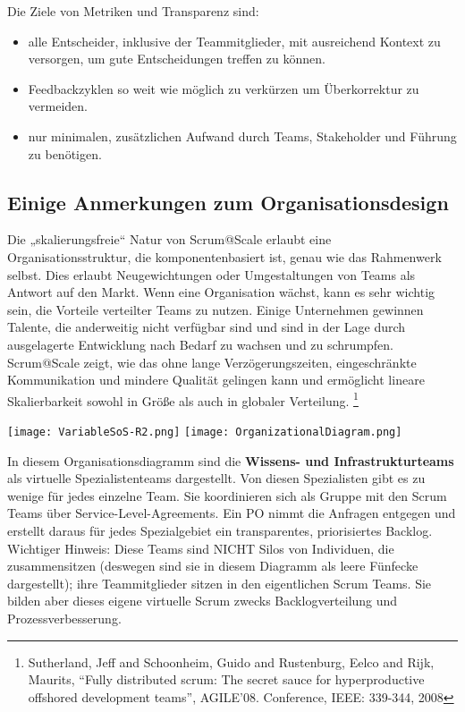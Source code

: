 \documentclass[12pt,a4paper,parskip=full]{scrartcl}
\begin{document}
Die Ziele von Metriken und Transparenz sind:
\begin{itemize}
\item alle Entscheider, inklusive der Teammitglieder, mit ausreichend Kontext zu
versorgen, um gute Entscheidungen treffen zu können.
\item Feedbackzyklen so weit wie möglich zu verkürzen um Überkorrektur zu vermeiden.
\item nur minimalen, zusätzlichen Aufwand durch Teams, Stakeholder und Führung zu
benötigen.
\end{itemize}

\subsection{Einige Anmerkungen zum Organisationsdesign}
Die „skalierungsfreie“ Natur von Scrum@Scale erlaubt eine Organisationsstruktur,
die komponentenbasiert ist, genau wie das Rahmenwerk selbst. Dies erlaubt
Neugewichtungen oder Umgestaltungen von Teams als Antwort auf den Markt.
Wenn eine Organisation wächst, kann es sehr wichtig sein, die Vorteile verteilter
Teams zu nutzen. Einige Unternehmen gewinnen Talente, die anderweitig nicht
verfügbar sind und sind in der Lage durch ausgelagerte Entwicklung nach Bedarf
zu wachsen und zu schrumpfen. Scrum@Scale zeigt, wie das ohne lange
Verzögerungszeiten, eingeschränkte Kommunikation und mindere Qualität gelingen
kann und ermöglicht lineare Skalierbarkeit sowohl in Größe als auch in globaler
Verteilung. \footnote{Sutherland, Jeff and Schoonheim,
Guido and Rustenburg, Eelco and Rijk, Maurits, ``Fully distributed scrum:
The secret sauce for hyperproductive offshored development teams'',
AGILE'08. Conference, IEEE: 339-344, 2008}

\texttt{[image: VariableSoS-R2.png]}
\texttt{[image: OrganizationalDiagram.png]}

In diesem Organisationsdiagramm sind die \textbf{Wissens- und Infrastrukturteams}
als virtuelle Spezialistenteams dargestellt. Von diesen Spezialisten gibt es zu
wenige für jedes einzelne Team. Sie koordinieren sich als Gruppe mit den Scrum
Teams über Service-Level-Agreements. Ein PO nimmt die Anfragen entgegen und
erstellt daraus für jedes Spezialgebiet ein transparentes, priorisiertes Backlog.
Wichtiger Hinweis: Diese Teams sind NICHT Silos von Individuen, die
zusammensitzen (deswegen sind sie in diesem Diagramm als leere Fünfecke
dargestellt); ihre Teammitglieder sitzen in den eigentlichen Scrum Teams.
Sie bilden aber dieses eigene virtuelle Scrum zwecks Backlogverteilung und
Prozessverbesserung.
\end{document}
